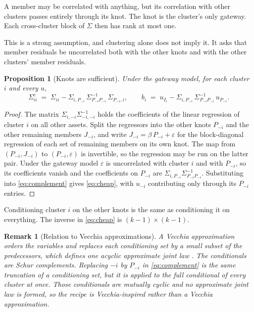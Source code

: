 \documentclass[11pt]{article}
\newtheorem{proposition}{Proposition}
\newtheorem{remark}{Remark}
\begin{document}
A member may be correlated with anything, but its correlation with other
clusters passes entirely through its knot. The knot is the cluster's only
gateway. Each cross-cluster block of $\Sigma$ then has rank at most one.

This is a strong assumption, and clustering alone does not imply it. It
asks that member residuals be uncorrelated both with the other knots and
with the other clusters' member residuals.

\begin{proposition}[Knots are sufficient]
\label{prop:sufficient}
Under the gateway model, for each cluster $i$ and every $u$,
\begin{equation}
  \Sigma^{c}_{ii}
  \;=\; \Sigma_{ii}-\Sigma_{i,P_{-i}}\,\Sigma_{P_{-i}P_{-i}}^{-1}\,\Sigma_{P_{-i},i},
  \qquad
  b_i \;=\; u_{I_i}-\Sigma_{i,P_{-i}}\,\Sigma_{P_{-i}P_{-i}}^{-1}\,u_{P_{-i}} .
  \label{eq:cheap}
\end{equation}
\end{proposition}

\begin{proof}
The matrix $\Sigma_{i,-i}\Sigma_{-i,-i}^{-1}$ holds the coefficients of the
linear regression of cluster $i$ on all other assets. Split the regressors
into the other knots $P_{-i}$ and the other remaining members $J_{-i}$, and write
$J_{-i}=\beta\,P_{-i}+\varepsilon$ for the block-diagonal regression of
each set of remaining members on its own knot. The map from $(P_{-i},J_{-i})$ to
$(P_{-i},\varepsilon)$ is invertible, so the regression may be run on the
latter pair. Under the gateway model $\varepsilon$ is uncorrelated with
cluster $i$ and with $P_{-i}$, so its coefficients vanish and the
coefficients on $P_{-i}$ are $\Sigma_{i,P_{-i}}\Sigma_{P_{-i}P_{-i}}^{-1}$.
Substituting into \eqref{eq:complement} gives \eqref{eq:cheap}, with
$u_{-i}$ contributing only through its $P_{-i}$ entries.
\end{proof}

Conditioning cluster $i$ on the other knots is the same as conditioning it
on everything. The inverse in \eqref{eq:cheap} is $(k-1)\times(k-1)$.

\begin{remark}[Relation to Vecchia approximations]
A Vecchia approximation orders the variables and replaces each conditioning
set by a small subset of the predecessors, which defines one acyclic
approximate joint law \cite{vecchia1988,katzfuss2021}. The conditionals
are Schur complements. Replacing $-i$ by $P_{-i}$ in \eqref{eq:complement}
is the same truncation of a conditioning set, but it is applied to the full
conditional of every cluster at once. Those conditionals are mutually
cyclic and no approximate joint law is formed, so the recipe is
Vecchia-inspired rather than a Vecchia approximation.
\end{remark}
\end{document}
